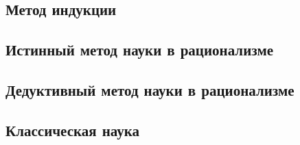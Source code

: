 \documentclass[main.tex]{subfiles}
\begin{document}
\subsection{Метод индукции}


\subsection{Истинный метод науки в рационализме}


\subsection{Дедуктивный метод науки в рационализме}


\subsection{Классическая наука}

\end{document}
